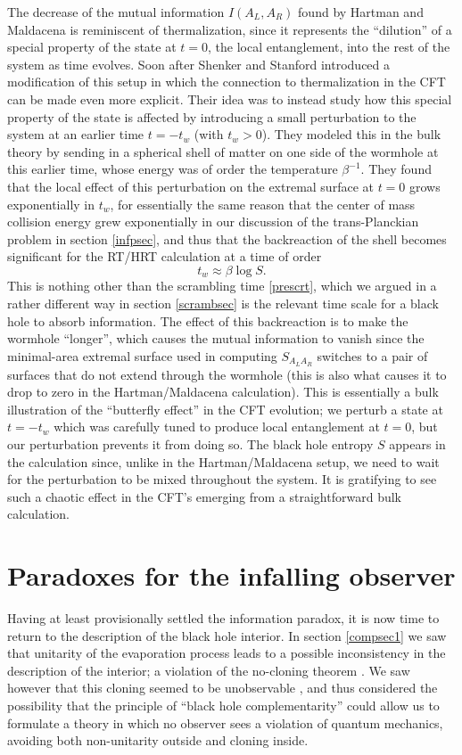 \documentclass[12pt]{article}
\newcommand{\be}{\begin{equation}}
\newcommand{\ee}{\end{equation}}
\begin{document}
The decrease of the mutual information $I(A_L,A_R)$ found by Hartman and Maldacena is reminiscent of thermalization, since it represents the ``dilution'' of a special property of the state at $t=0$, the local entanglement, into the rest of the system as time evolves.  Soon after Shenker and Stanford introduced a modification of this setup in which the connection to thermalization in the CFT can be made even more explicit.  Their idea was to instead study how this special property of the state is affected by introducing a small perturbation to the system at an earlier time $t=-t_w$ (with $t_w>0$).  They modeled this in the bulk theory by sending in a spherical shell of matter on one side of the wormhole at this earlier time, whose energy was of order the temperature $\beta^{-1}$.  They found that the local effect of this perturbation on the extremal surface at $t=0$ grows exponentially in $t_w$, for essentially the same reason that the center of mass collision energy grew exponentially in our discussion of the trans-Planckian problem in section \ref{infpsec}, and thus that the backreaction of the shell becomes significant for the RT/HRT calculation at a time of order 
\be
t_w\approx \beta \log S.
\ee
This is nothing other than the scrambling time \eqref{prescrt}, which we argued in a rather different way in section \ref{scrambsec} is the relevant time scale for a black hole to absorb information.  The effect of this backreaction is to make the wormhole ``longer'', which causes the mutual information to vanish since the minimal-area extremal surface used in computing $S_{A_L A_R}$ switches to a pair of surfaces that do not extend through the wormhole (this is also what causes it to drop to zero in the Hartman/Maldacena calculation).  This is essentially a bulk illustration of the ``butterfly effect'' in the CFT evolution; we perturb a state at $t=-t_w$ which was carefully tuned to produce local entanglement at $t=0$, but our perturbation prevents it from doing so.  The black hole entropy $S$ appears in the calculation since, unlike in the Hartman/Maldacena setup, we need to wait for the perturbation to be mixed throughout the system.  It is gratifying to see such a chaotic effect in the CFT's emerging from a straightforward bulk calculation.  

\section{Paradoxes for the infalling observer}\label{paradoxsec}
Having at least provisionally settled the information paradox, it is now time to return to the description of the black hole interior.  In section \ref{compsec1} we saw that unitarity of the evaporation process leads to a possible inconsistency in the description of the interior; a violation of the no-cloning theorem \cite{Susskind:1993mu}.  We saw however that this cloning seemed to be unobservable \cite{Susskind:1993mu,Hayden:2007cs}, and thus considered the possibility that the principle of ``black hole complementarity'' could allow us to formulate a theory in which no observer sees a violation of quantum mechanics, avoiding both non-unitarity outside and cloning inside.  
\end{document}
